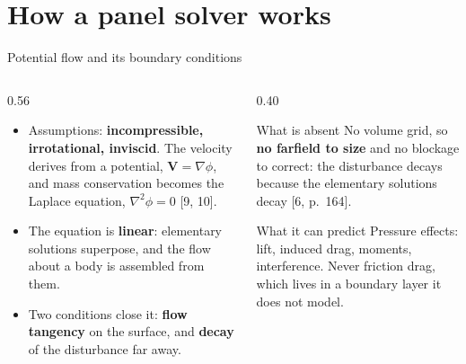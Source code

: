 %
%

\section{How a panel solver works}

\begin{frame}{Potential flow and its boundary conditions}
\begin{columns}[T]
\begin{column}{0.56\textwidth}
\begin{itemize}\small
  \item Assumptions: \textbf{incompressible, irrotational, inviscid}. The
        velocity derives from a potential, \(\mathbf{V} = \nabla\phi\), and
        mass conservation becomes the Laplace equation,
        \(\nabla^2\phi = 0\) [9, 10].
  \item The equation is \textbf{linear}: elementary solutions superpose, and
        the flow about a body is assembled from them.
  \item Two conditions close it: \textbf{flow tangency} on the surface, and
        \textbf{decay} of the disturbance far away.
\end{itemize}
\end{column}
\begin{column}{0.40\textwidth}
\begin{block}{What is absent}
\small No volume grid, so \textbf{no farfield to size} and no blockage to
correct: the disturbance decays because the elementary solutions decay
[6, p.~164].
\end{block}
\begin{block}{What it can predict}
\small Pressure effects: lift, induced drag, moments, interference. Never
friction drag, which lives in a boundary layer it does not model.
\end{block}
\end{column}
\end{columns}
\end{frame}

